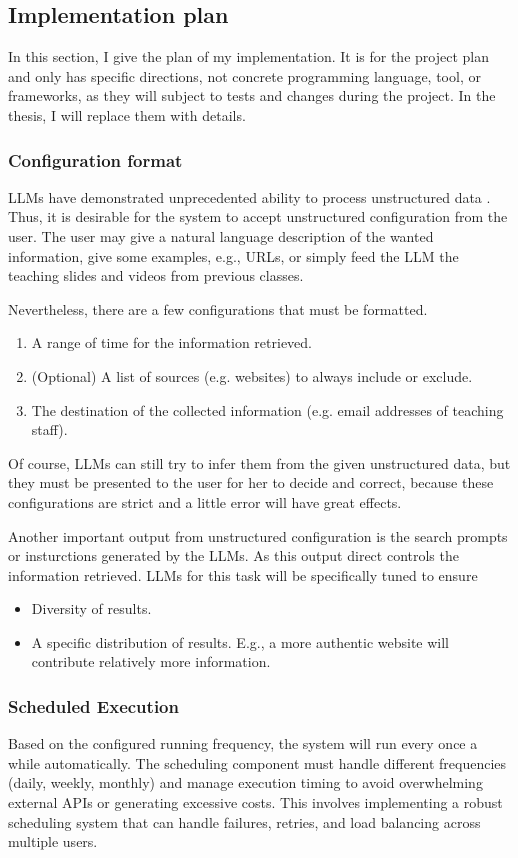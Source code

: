 \documentclass[final-report]{report-template}
\begin{document}
\subsection{Implementation plan}
In this section, I give the plan of my implementation. It is for the project
plan and only has specific directions, not concrete programming language, tool,
or frameworks, as they will subject to tests and changes during the project.
In the thesis, I will replace them with details.

\subsubsection{Configuration format} 
LLMs have demonstrated unprecedented ability to process unstructured data
\cite{llm.unstructured.data.1, llm.unstructured.data.2}. Thus, it is desirable
for the system to accept unstructured configuration from the user. The user may
give a natural language description of the wanted information, give some
examples, e.g., URLs, or simply feed the LLM the teaching slides and videos
from previous classes.

Nevertheless, there are a few configurations that must be formatted.
\begin{enumerate}
	\item A range of time for the information retrieved.
	\item (Optional) A list of sources (e.g. websites) to always include or exclude.
	\item The destination of the collected information (e.g. email addresses of
		teaching staff).
\end{enumerate}
Of course, LLMs can still try to infer them from the given unstructured data,
but they must be presented to the user for her to decide and correct, because
these configurations are strict and a little error will have great effects.

Another important output from unstructured configuration is the search prompts
or insturctions generated by the LLMs. As this output direct controls the
information retrieved. LLMs for this task will be specifically tuned to ensure
\begin{itemize}
	\item Diversity of results.
	\item A specific distribution of results. E.g., a more authentic website
		will contribute relatively more information.
\end{itemize}

\subsubsection{Scheduled Execution} Based on the configured running frequency,
the system will run every once a while automatically. The scheduling component must handle
different frequencies (daily, weekly, monthly) and manage execution timing to
avoid overwhelming external APIs or generating excessive costs. This involves
implementing a robust scheduling system that can handle failures, retries, and
load balancing across multiple users.
\end{document}
